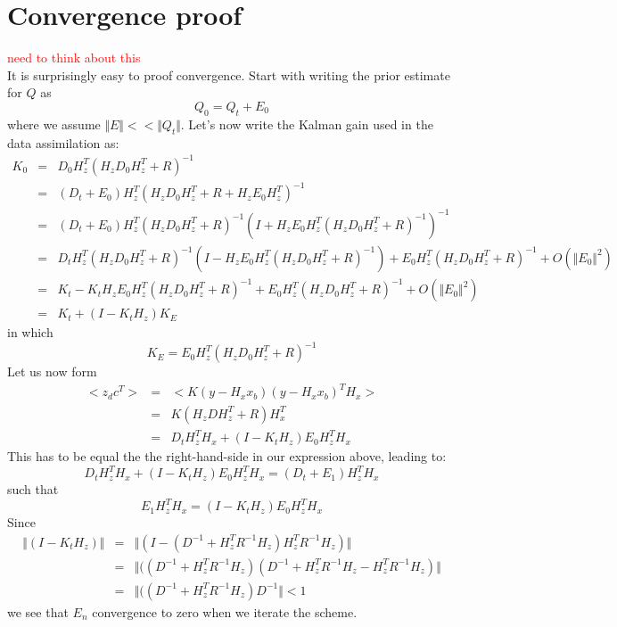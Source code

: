 \documentclass[a4paper,10pt]{article}
\numberwithin{equation}{section}
\begin{document}
\section{Convergence proof}
\textcolor{red}{need to think about this}\\
It is surprisingly easy to proof convergence. Start with writing the prior estimate for $Q$ as
\begin{equation}
Q_0 = Q_t + E_0
\end{equation}
where we assume $\Vert E \Vert << \Vert Q_t \Vert$. Let's now write the Kalman gain used in the data assimilation as:
\begin{eqnarray}
K_0 & = & D_0H_z^T(H_zD_0H_z^T + R)^{-1} \nonumber \\
& = & (D_t + E_0)H_z^T(H_zD_0H_z^T + R +H_zE_0H_z^T )^{-1} \nonumber \\
& = & (D_t + E_0) H_z^T(H_zD_0H_z^T + R)^{-1}\left(I +H_zE_0H_z^T(H_zD_0H_z^T + R)^{-1} \right)^{-1}  \nonumber \\
& = & D_tH_z^T(H_zD_0H_z^T + R)^{-1}\left(I -H_zE_0H_z^T(H_zD_0H_z^T + R)^{-1} \right) + E_0H_z^T(H_zD_0H_z^T + R)^{-1}+O\left(\Vert E_0 \Vert^2 \right)  \nonumber \\
& = & K_t - K_t H_zE_0H_z^T(H_zD_0H_z^T + R)^{-1}  + E_0H_z^T(H_zD_0H_z^T + R)^{-1} + O\left(\Vert E_0 \Vert^2 \right) \nonumber \\
& = & K_t + (I-K_tH_z)K_E
\end{eqnarray}
in which
\begin{equation}
K_E = E_0H_z^T(H_zD_0H_z^T + R)^{-1}
\end{equation}
Let us now form
\begin{eqnarray}
<z_d c^T> & = & <K(y-H_x x_b)(y-H_x x_b)^T H_x>  \nonumber \\
& = & K(H_zDH_z^T + R)H_x^T \nonumber \\
& = & D_tH_z^TH_x + (I-K_t H_z)E_0H_z^T H_x
\end{eqnarray}
This has to be equal the the right-hand-side in our expression above, leading to:
\begin{equation}
D_tH_z^TH_x + (I-K_t H_z)E_0H_z^T H_x = (D_t + E_1)H_z^T H_x
\end{equation}
such that
\begin{equation}
E_1 H_z^T H_x = (I-K_t H_z)E_0H_z^T H_x 
\end{equation}
Since
\begin{eqnarray}
\Vert(I-K_t H_z)\Vert &  = & \Vert(I-(D^{-1}+H_z^TR^{-1}H_z)H_z^TR^{-1}H_z)\Vert \nonumber \\
& = & \Vert((D^{-1}+H_z^TR^{-1}H_z) (D^{-1}+H_z^TR^{-1}H_z - H_z^TR^{-1}H_z)\Vert \nonumber \\
& = &  \Vert((D^{-1}+H_z^TR^{-1}H_z) D^{-1}\Vert < 1
\end{eqnarray}
we see that $E_n$ convergence to zero when we iterate the scheme.
\end{document}
